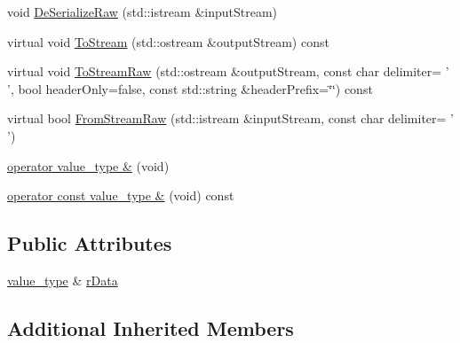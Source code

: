 \begin{DoxyCompactItemize}
void \hyperlink{classmts_generic_object_proxy_ref_a35a8d210a8fdbc6d06707b6c562c4ea3}{De\-Serialize\-Raw} (std\-::istream \&input\-Stream)
\item 
virtual void \hyperlink{classmts_generic_object_proxy_ref_aa3d12378361aadf0810d4a4aadd108ae}{To\-Stream} (std\-::ostream \&output\-Stream) const 
\item 
virtual void \hyperlink{classmts_generic_object_proxy_ref_a1d44d780c6f98b8d3c0e882312b721ad}{To\-Stream\-Raw} (std\-::ostream \&output\-Stream, const char delimiter= ' ', bool header\-Only=false, const std\-::string \&header\-Prefix=\char`\"{}\char`\"{}) const 
\item 
virtual bool \hyperlink{classmts_generic_object_proxy_ref_ac88583dd9d665e1b145e030d44d3b664}{From\-Stream\-Raw} (std\-::istream \&input\-Stream, const char delimiter= ' ')
\end{DoxyCompactItemize}
{\bf }\par
\begin{DoxyCompactItemize}
\item 
\hyperlink{classmts_generic_object_proxy_ref_a7c8c9952cd429eaefaf6f5a95188a55a}{operator value\-\_\-type \&} (void)
\item 
\hyperlink{classmts_generic_object_proxy_ref_a04b5d526e3b3c4168d4ad47a255022d8}{operator const value\-\_\-type \&} (void) const 
\end{DoxyCompactItemize}

\subsection*{Public Attributes}
\begin{DoxyCompactItemize}
\item 
\hyperlink{classmts_generic_object_proxy_ref_af50eac4bbf86d9609d7cd77c33d4bf54}{value\-\_\-type} \& \hyperlink{classmts_generic_object_proxy_ref_a588d268b7943faf5949bc201e5ef502a}{r\-Data}
\end{DoxyCompactItemize}
\subsection*{Additional Inherited Members}


